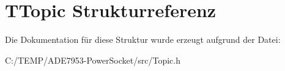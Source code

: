 \hypertarget{struct_t_topic}{}\section{T\+Topic Strukturreferenz}
\label{struct_t_topic}


Die Dokumentation für diese Struktur wurde erzeugt aufgrund der Datei\+:\begin{DoxyCompactItemize}
\item 
C\+:/\+T\+E\+M\+P/\+A\+D\+E7953-\/\+Power\+Socket/src/Topic.\+h\end{DoxyCompactItemize}
